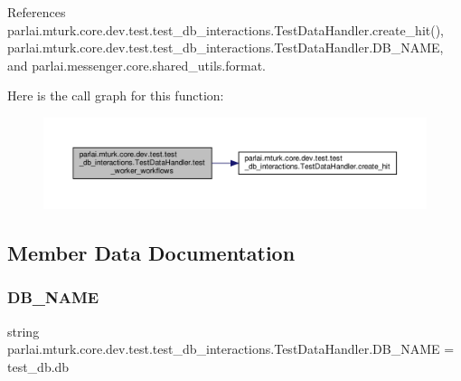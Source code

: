References parlai.\+mturk.\+core.\+dev.\+test.\+test\+\_\+db\+\_\+interactions.\+Test\+Data\+Handler.\+create\+\_\+hit(), parlai.\+mturk.\+core.\+dev.\+test.\+test\+\_\+db\+\_\+interactions.\+Test\+Data\+Handler.\+D\+B\+\_\+\+N\+A\+ME, and parlai.\+messenger.\+core.\+shared\+\_\+utils.\+format.

Here is the call graph for this function\+:
\nopagebreak
\begin{figure}[H]
\begin{center}
\leavevmode
\includegraphics[width=350pt]{classparlai_1_1mturk_1_1core_1_1dev_1_1test_1_1test__db__interactions_1_1TestDataHandler_ae2fb8890a053c2c5bb84f0a27c021140_cgraph}
\end{center}
\end{figure}


\subsection{Member Data Documentation}
\mbox{\label{classparlai_1_1mturk_1_1core_1_1dev_1_1test_1_1test__db__interactions_1_1TestDataHandler_a9273ea295b745b037629ac9c0fa1056a}} 
\subsubsection{\texorpdfstring{D\+B\+\_\+\+N\+A\+ME}{DB\_NAME}}
{\footnotesize\ttfamily string parlai.\+mturk.\+core.\+dev.\+test.\+test\+\_\+db\+\_\+interactions.\+Test\+Data\+Handler.\+D\+B\+\_\+\+N\+A\+ME = \textquotesingle{}test\+\_\+db.\+db\textquotesingle{}\hspace{0.3cm}{\ttfamily [static]}}



